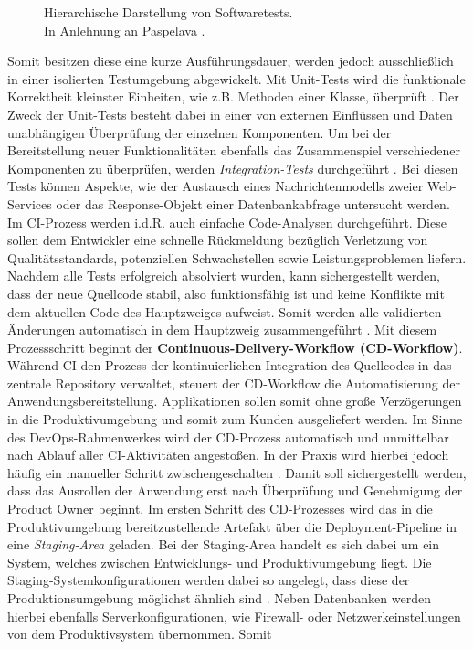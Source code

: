 \begin{center}
	\begin{figure}[H]
		\centering
		\caption[Hierarchische Darstellung von Softwaretests]{Hierarchische Darstellung von Softwaretests.\\ \hspace{0.5cm}In Anlehnung an Paspelava \cite{Exposit.2021}.}
		\label{fig:Tests}
	\end{figure}
\end{center}
\vspace*{-15mm}
Somit besitzen diese eine kurze Ausführungsdauer, werden jedoch ausschließlich in einer isolierten Testumgebung abgewickelt. Mit Unit-Tests wird die funktionale Korrektheit kleinster Einheiten, wie z.B. Methoden einer Klasse, über\-prüft \cite[177]{Jamil.1122201611242016}. Der Zweck der Unit-Tests besteht dabei in einer von externen Einflüssen und Daten unabhängigen Überprüfung der einzelnen Komponenten. Um bei der Bereitstellung neuer Funktionalitäten ebenfalls das Zusammenspiel verschiedener Komponenten zu überprüfen, werden \textit{Integration-Tests} durchgeführt \cite[177]{Jamil.1122201611242016}. Bei diesen Tests können Aspekte, wie der Austausch eines Nachrichtenmodells zweier Web-Services oder das Response-Objekt einer Datenbankabfrage untersucht werden. Im CI-Prozess werden i.d.R. auch einfache Code-Analysen durchgeführt. Diese sollen dem Entwickler eine schnelle Rückmeldung bezüglich Verletzung von Qualitätsstandards, potenziellen Schwachstellen sowie Leistungsproblemen liefern. Nachdem alle Tests erfolgreich absolviert wurden, kann sichergestellt werden, dass der neue Quellcode stabil, also funktionsfähig ist und keine Konflikte mit dem aktuellen Code des Hauptzweiges aufweist. Somit werden alle validierten Änderungen automatisch in dem Hauptzweig zusammengeführt \cite[S. 19 ff.]{Halstenberg.2020}. Mit diesem Prozessschritt beginnt der \textbf{Continuous-Delivery-Workflow (\acs{CD}-Workflow)}.  Während CI den Prozess der kontinuierlichen Integration des Quellcodes in das zentrale Repository verwaltet, steuert der CD-Workflow die Automatisierung der Anwendungsbereitstellung. Applikationen sollen somit ohne große Verzögerungen in die Produktivumgebung und somit zum Kunden ausgeliefert werden. Im Sinne des DevOps-Rahmenwerkes wird der CD-Prozess automatisch und unmittelbar nach Ablauf aller CI-Aktivitäten angestoßen. In der Praxis wird hierbei jedoch häufig ein manueller Schritt zwischengeschalten \cite[S. 19 ff.]{Halstenberg.2020}. Damit soll sichergestellt werden, dass das Ausrollen der Anwendung erst nach Überprüfung und Genehmigung der Product Owner beginnt. Im ersten Schritt des CD-Prozesses wird das in die Produktivumgebung bereitzustellende Artefakt über die Deployment-Pipeline in eine \textit{Staging-Area} geladen. Bei der Staging-Area handelt es sich dabei um ein System, welches zwischen Entwicklungs- und Produktivumgebung liegt. Die Staging-Systemkonfigurationen werden dabei so angelegt, dass diese der Produktionsumgebung möglichst ähnlich sind \cite{Reynolds.20220203}. Neben Datenbanken werden hierbei ebenfalls Serverkonfigurationen, wie Firewall- oder Netzwerkeinstellungen von dem Produktivsystem übernommen. Somit 
